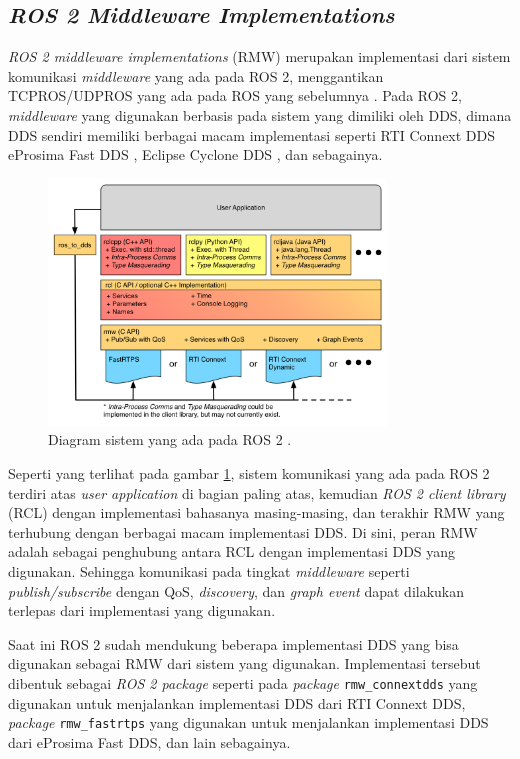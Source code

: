 \subsection{\emph{ROS 2 Middleware Implementations}}
\label{subsec:rmw}

\emph{ROS 2 middleware implementations} (RMW) merupakan implementasi dari sistem komunikasi \emph{middleware} yang ada pada ROS 2,
  menggantikan TCPROS/UDPROS yang ada pada ROS yang sebelumnya \citep{url:rmwdesign}.
Pada ROS 2, \emph{middleware} yang digunakan berbasis pada sistem yang dimiliki oleh DDS,
  dimana DDS sendiri memiliki berbagai macam implementasi seperti RTI Connext DDS \citep{url:rmwdesign} eProsima Fast DDS \citep{url:fastdds},
  Eclipse Cyclone DDS \citep{url:cyclonedds},
  dan sebagainya.

\begin{figure}
  \centering
  \includegraphics[width=0.8\textwidth,keepaspectratio]{gambar/diagram-sistem-ros2.png}
  \caption{Diagram sistem yang ada pada ROS 2 \citep{url:ros2interfacesconcept}.}
  \label{fig:diagramsistemros2}
\end{figure}

Seperti yang terlihat pada gambar \ref{fig:diagramsistemros2},
  sistem komunikasi yang ada pada ROS 2 terdiri atas \emph{user application} di bagian paling atas,
  kemudian \emph{ROS 2 client library} (RCL) dengan implementasi bahasanya masing-masing,
  dan terakhir RMW yang terhubung dengan berbagai macam implementasi DDS.
Di sini, peran RMW adalah sebagai penghubung antara RCL dengan implementasi DDS yang digunakan.
Sehingga komunikasi pada tingkat \emph{middleware} seperti \emph{publish/subscribe} dengan QoS, \emph{discovery},
  dan \emph{graph event} dapat dilakukan terlepas dari implementasi yang digunakan.

Saat ini ROS 2 sudah mendukung beberapa implementasi DDS yang bisa digunakan sebagai RMW dari sistem yang digunakan.
  Implementasi tersebut dibentuk sebagai \emph{ROS 2 package} seperti pada \emph{package} \lstinline{rmw_connextdds} yang digunakan untuk menjalankan implementasi DDS dari RTI Connext DDS,
  \emph{package} \lstinline{rmw_fastrtps} yang digunakan untuk menjalankan implementasi DDS dari eProsima Fast DDS,
  dan lain sebagainya.
